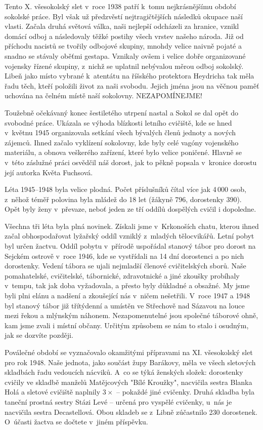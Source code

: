 \documentclass[a5paper, 11pt, twoside]{article}
\begin{document}
Tento X. všesokolský slet v~roce 1938 patří k~tomu nejkrásnějšímu období
sokolské práce. Byl však už předzvěstí nejtragičtějších následků okupace
naší vlasti. Začala druhá světová válka, naši nejlepší odcházeli za
hranice, vznikl domácí odboj a následovaly těžké postihy všech vrstev
našeho národa. Již od příchodu nacistů se tvořily odbojové skupiny,
mnohdy velice naivně pojaté a snadno se stávaly oběťmi gestapa. Vznikaly
ovšem i velice dobře organizované vojensky řízené skupiny, z~nichž se
uplatnil nebývalou měrou odboj sokolský. Libeň jako místo vybrané
k~atentátu na říšského protektora Heydricha tak měla řadu těch, kteří
položili život za naši svobodu. Jejich jména jsou na věčnou paměť
uchována na čelném místě naší sokolovny. NEZAPOMÍNEJME!

Toužebně očekávaný konec šestiletého utrpení nastal a Sokol se dal opět
do svobodné práce. Ukázala se výhoda blízkosti letního cvičiště, kde se
hned v~květnu 1945 organizovala setkání všech bývalých členů jednoty a
nových zájemců. Ihned začalo vyklízení sokolovny, kde byly celé vagóny
vojenského materiálu, a obnova veškerého zařízení, které bylo velice
poničené. Hlavně se v~této záslužné práci osvědčil náš dorost, jak to
pěkně popsala v~kronice dorostu její autorka Květa Fuchsová.

Léta 1945--1948 byla velice plodná. Počet příslušníků čítal
více jak 4\,000 osob, z~něhož téměř polovina byla mládež do 18 let
(žákyně 796, dorostenky 390). Opět byly ženy v~převaze, neboť jeden ze
tří oddílů dospělých cvičil i dopoledne.

Všechna tři léta byla plná novinek. Získali jsme v~Krkonoších chatu,
kterou ihned začal obhospodařovat lyžařský oddíl vzniklý z~mladých
tělocvikářů. Letní pobyt byl určen žactvu. Oddíl pobytu v~přírodě
uspořádal stanový tábor pro dorost na Sejckém ostrově v~roce 1946, kde
se vystřídali na 14 dní dorostenci a po nich dorostenky. Vedení tábora
se ujali nejmladší členové cvičitelských sborů. Naše pomahatelské,
cvičitelské, tábornické, zdravotnické a jiné zkoušky probíhaly v~tempu,
tak jak doba vyžadovala, a přesto byly důkladné a obsažné. My jsme byli
plni elánu a nadšení a zkoušející nás v~ničem nešetřili. V~roce 1947 a
1948 byl stanový tábor již třítýdenní a umístěn ve Střechově nad Sázavou
na louce mezi řekou a mlýnským náhonem. Nezapomenutelné jsou společné
táborové ohně, kam jsme zvali i místní občany. Určitým způsobem se nám
to stalo i osudným, jak se dozvíte později.

Poválečné období se vyznačovalo okamžitými přípravami na XI. všesokolský
slet pro rok 1948. Naše jednota, jako součást župy Barákovy, měla ve
všech sletových skladbách řadu vedoucích nácviků. A~co se týká ženských
složek: dorostenky cvičily ve skladbě manželů Matějcových "Bílé
Kroužky", nacvičila sestra Blanka Holá a sletové cvičiště naplnily \(3\times\)
-- pokaždé jiné cvičenky. Druhá skladba byla taneční prostná sestry
Stázi Levé -- určená pro vyspělé cvičenky, u~nás je nacvičila sestra
Decastellová. Obou skladeb se z~Libně zúčastnilo 230 dorostenek.
O~účasti žactva se dočtete v~jiném příspěvku.
\end{document}
